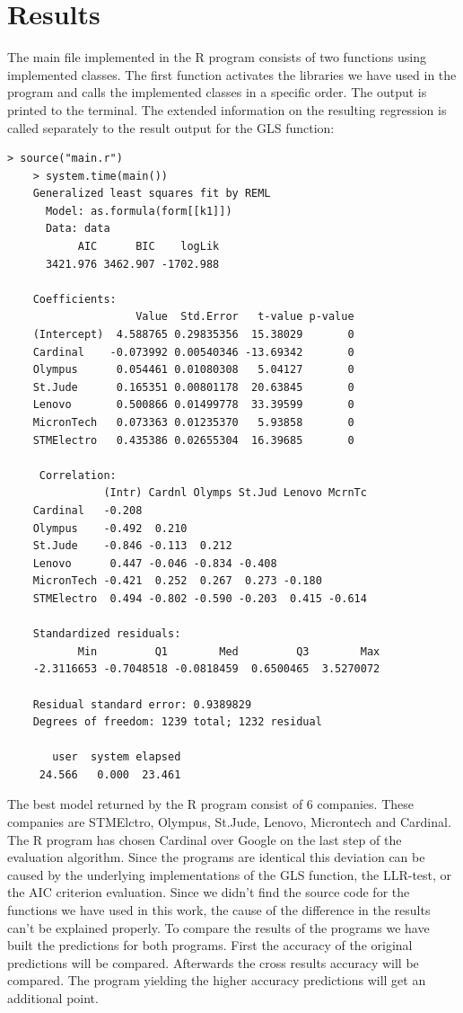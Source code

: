 \documentclass[
  twoside,
  11pt, a4paper,
  footinclude=true,
  headinclude=true,
  cleardoublepage=empty
]{scrreprt}
\begin{document}
    \section{Results}
    The main file implemented in the R program consists of two functions using implemented classes. The first function activates the libraries we have used in the program and calls the implemented classes in a specific order. The output is printed to the terminal. The extended information on the resulting regression is called separately to the result output for the GLS function:
    \begin{lstlisting}[basicstyle=\footnotesize]
    > source("main.r")
    > system.time(main())
    Generalized least squares fit by REML
      Model: as.formula(form[[k1]]) 
      Data: data 
           AIC      BIC    logLik
      3421.976 3462.907 -1702.988
    
    Coefficients:
                    Value  Std.Error   t-value p-value
    (Intercept)  4.588765 0.29835356  15.38029       0
    Cardinal    -0.073992 0.00540346 -13.69342       0
    Olympus      0.054461 0.01080308   5.04127       0
    St.Jude      0.165351 0.00801178  20.63845       0
    Lenovo       0.500866 0.01499778  33.39599       0
    MicronTech   0.073363 0.01235370   5.93858       0
    STMElectro   0.435386 0.02655304  16.39685       0
    
     Correlation: 
               (Intr) Cardnl Olymps St.Jud Lenovo McrnTc
    Cardinal   -0.208                                   
    Olympus    -0.492  0.210                            
    St.Jude    -0.846 -0.113  0.212                     
    Lenovo      0.447 -0.046 -0.834 -0.408              
    MicronTech -0.421  0.252  0.267  0.273 -0.180       
    STMElectro  0.494 -0.802 -0.590 -0.203  0.415 -0.614
    
    Standardized residuals:
           Min         Q1        Med         Q3        Max 
    -2.3116653 -0.7048518 -0.0818459  0.6500465  3.5270072 
    
    Residual standard error: 0.9389829 
    Degrees of freedom: 1239 total; 1232 residual
    
       user  system elapsed 
     24.566   0.000  23.461 
    \end{lstlisting}    
    The best model returned by the R program consist of 6 companies. These companies are STMElctro, Olympus, St.Jude, Lenovo, Microntech and Cardinal. The R program has chosen Cardinal over Google on the last step of the evaluation algorithm. Since the programs are identical this deviation can be caused by the underlying implementations of the GLS function, the LLR-test, or the AIC criterion evaluation. Since we didn't find the source code for the functions we have used in this work, the cause of the difference in the results can't be explained properly. To compare the results of the programs we have built the predictions for both programs. First the accuracy of the original predictions will be compared. Afterwards the cross results accuracy will be compared. The program yielding the higher accuracy predictions will get an additional point.\\
\end{document}

